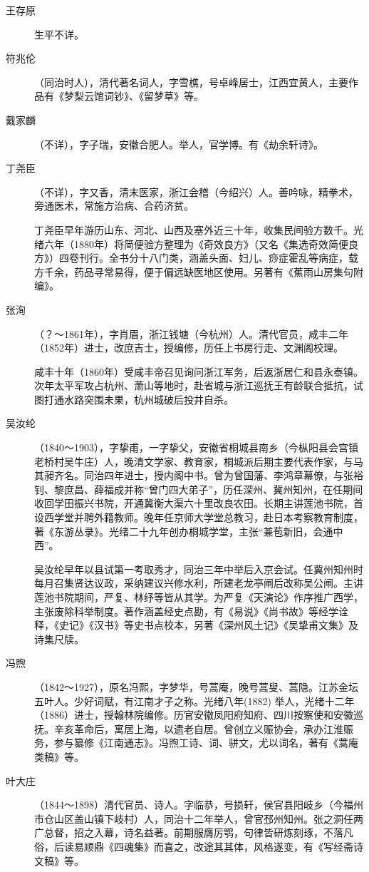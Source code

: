 \begin{description}
  \item[王存原] 生平不详。
  \item[符兆伦] （同治时人），清代著名词人，字雪樵，号卓峰居士，江西宜黄人，主要作品有《梦梨云馆词钞》、《留梦草》等。
  \item[戴家麟] （不详），字子瑞，安徽合肥人。举人，官学博。有《劫余轩诗》。
  \item[丁尧臣] （不详），字又香，清末医家，浙江会稽（今绍兴）人。善吟咏，精拳术，旁通医术，常施方治病、合药济贫。\par
        丁尧臣早年游历山东、河北、山西及塞外近三十年，收集民间验方数千。光绪六年（1880年）将简便验方整理为《奇效良方》（又名《集选奇效简便良方》）四卷刊行。全书分十八门类，涵盖头面、妇儿、痧症霍乱等病症，载方千余，药品寻常易得，便于偏远缺医地区使用。另著有《蕉雨山房集句附编》。
  \item[张洵] （？～1861年），字肖眉，浙江钱塘（今杭州）人。清代官员，咸丰二年（1852年）进士，改庶吉士，授编修，历任上书房行走、文渊阁校理。\par
        咸丰十年（1860年）受咸丰帝召见询问浙江军务，后返浙居仁和县永泰镇。次年太平军攻占杭州、萧山等地时，赴省城与浙江巡抚王有龄联合抵抗，试图打通水路突围未果，杭州城破后投井自杀。
  \item[吴汝纶] （1840～1903），字挚甫，一字挚父，安徽省桐城县南乡（今枞阳县会宫镇老桥村吴牛庄）人，晚清文学家、教育家，桐城派后期主要代表作家，与马其昶齐名。同治四年进士，授内阁中书。曾为曾国藩、李鸿章幕僚，与张裕钊、黎庶昌、薛福成并称“曾门四大弟子”，历任深州、冀州知州，在任期间收回学田振兴书院，开通冀衡大渠六十里改良农田。长期主讲莲池书院，首设西学堂并聘外籍教师。晚年任京师大学堂总教习，赴日本考察教育制度，著《东游丛录》。光绪二十九年创办桐城学堂，主张“兼苞新旧，会通中西”。\par
        吴汝纶早年以县试第一考取秀才，同治三年中举后入京会试。任冀州知州时每月召集贤达议政，采纳建议兴修水利，所建老龙亭闸后改称吴公闸。主讲莲池书院期间，严复、林纾等皆从其学。为严复《天演论》作序推广西学，主张废除科举制度。著作涵盖经史点勘，有《易说》《尚书故》等经学诠释，《史记》《汉书》等史书点校本，另著《深州风土记》《吴挚甫文集》及诗集尺牍。
  \item[冯煦] （1842～1927），原名冯熙，字梦华，号蒿庵，晚号蒿叟、蒿隐。江苏金坛五叶人。少好词赋，有江南才子之称。光绪八年(1882) 举人，光绪十二年（1886）进士，授翰林院编修。历官安徽凤阳府知府、四川按察使和安徽巡抚。辛亥革命后，寓居上海，以遗老自居。曾创立义赈协会，承办江淮赈务，参与纂修《江南通志》。冯煦工诗、词、骈文，尤以词名，著有《蒿庵类稿》等。
  \item[叶大庄] （1844～1898）清代官员、诗人。字临恭，号损轩，侯官县阳岐乡（今福州市仓山区盖山镇下岐村）人，同治十二年举人，曾官邳州知州。张之洞任两广总督，招之入幕，诗名益著。前期服膺厉鹗，句律皆研炼刻琢，不落凡俗，后读易顺鼎《四魂集》而喜之，改途其其体，风格遂变，有《写经斋诗文稿》等。

\end{description}
